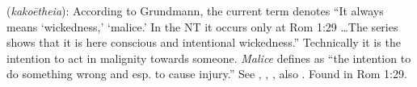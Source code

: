 \item[Malice,]

(\textit{kakoētheia}):
According to Grundmann, the current term denotes ``It always means `wickedness,' `malice.' In the NT it occurs only at Rom 1:29 \ldots The series shows that it is here conscious and intentional wickedness.'' 
Technically it is the intention to act in malignity towards  someone. \emph{Malice} defines as ``the intention to do something wrong and esp. to cause injury.''
See , , , also .
Found in Rom 1:29.
